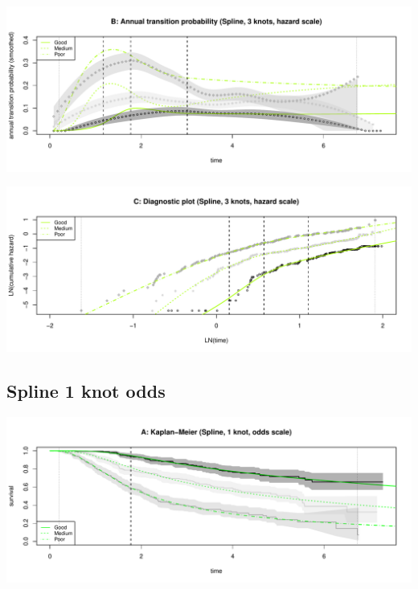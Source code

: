\documentclass[
]{article}
\begin{document}
\begin{flushleft}\includegraphics[height=0.25\textheight]{Images/spline_hazard3-2} \end{flushleft}

\begin{flushleft}\includegraphics[height=0.25\textheight]{Images/spline_hazard3-3} \end{flushleft}

\clearpage

\hypertarget{spline-1-knot-odds}{%
\subsection{Spline 1 knot odds}\label{spline-1-knot-odds}}

\begin{flushleft}\includegraphics[height=0.25\textheight]{Images/spline_odds1-1} \end{flushleft}
\end{document}
